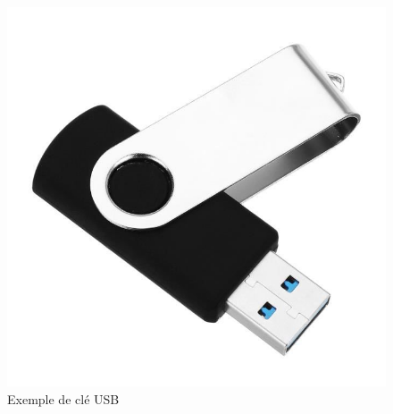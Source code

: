 \documentclass[a4paper,12pt]{article}
\begin{document}
\begin{itemize}
\begin{figure}[h!]
                        \includegraphics[scale=0.2]{Cle_USB.jpg}
                        \caption{Exemple de clé USB}
                        \label{fig: Exemple de clé USB}
                    \end{figure}
            \end{itemize}
            
    
    \newpage
    
\end{document}
